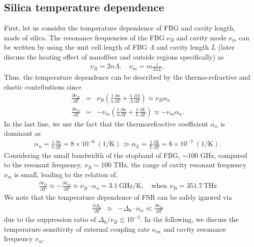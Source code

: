 \documentclass[aps,pra, onecolumn,superscriptaddress,nopacs,floatfix, showkeys, notitlepage]{revtex4-1}
\begin{document}
\subsection{Silica temperature dependence}
First, let us consider the temperature dependence of FBG and cavity length, made of silica. 
The resonance frequencies of the FBG $\nu_B$ and cavity mode $\nu_m$ can be written by using the unit cell length of FBG $\Lambda$ and cavity length $L$ (later discuss the heating effect of nanofiber and outside regions specifically)  as
\begin{eqnarray}
    \nu_B = 2 n \Lambda,\quad
    \nu_m = m\frac{c}{2n L},
\end{eqnarray}
Thus, the temperature dependence can be described by the thermo-refractive and elastic contributions since 
\begin{eqnarray}
    \frac{\partial \nu_B}{\partial T }&=& \nu_B\left(\frac{1}{n}\frac{\partial n}{\partial T}+\frac{1}{\Lambda}\frac{\partial \Lambda}{\partial T}\right) \approx  \nu_B\alpha_n\\
    \frac{\partial \nu_m}{\partial T }&=& -\nu_m\left(\frac{1}{n}\frac{\partial n}{\partial T}+\frac{1}{L}\frac{\partial L}{\partial T}\right)\approx -\nu_m\alpha_n.\label{eq:thermo-refractive}
\end{eqnarray}
In the last line, we use the fact that the thermorefractive coefficient $\alpha_n$ is dominant as
\begin{eqnarray}
    \alpha_n=\frac{1}{n}\frac{\partial n}{\partial T}=8\times 10^{-6}~\mathrm{(1/K)} \gg \alpha_L=\frac{1}{L}\frac{\partial L}{\partial T}=6\times 10^{-7}~\mathrm{(1/K)}.
\end{eqnarray}
Considering the small bandwidth of the stopband of FBG, $\sim 100$ GHz, compared to the resonant frequency, $\nu_B\sim 100$ THz, the range of cavity resonant frequency $\nu_m$ is small, leading to the relation of,
\begin{eqnarray}
    \frac{\partial \nu_B}{\partial T }\approx -\frac{\partial \nu_m}{\partial T } \approx \nu_B \cdot \alpha_n =3.1~\mathrm{GHz/K},\quad\mathrm{when~~\nu_B = 351.7~THz}
    \label{eq:nu_n}
\end{eqnarray}
We note that the temperature dependence of FSR can be safely ignored via
\begin{eqnarray}
    \frac{\partial \Delta_0}{\partial T }&\approx&-\Delta_0 \cdot\alpha_n \ll  \frac{\partial \nu_m}{\partial T }
    \label{eq:fsr_n}
\end{eqnarray}
due to the suppression ratio of $\Delta_0/\nu_B\lesssim 10^{-3}$.
In the following, we discuss the temperature sensitivity of external coupling rate $\kappa_\mathrm{ex}$ and cavity resonance frequency $\nu_m$.
\end{document}
